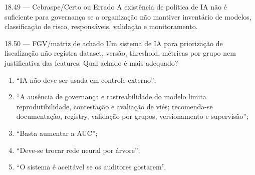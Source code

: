 \begin{questao}{ 18.49 — Cebraspe/Certo ou Errado}
A existência de política de IA não é suficiente para governança se a organização não mantiver inventário de modelos, classificação de risco, responsáveis, validação e monitoramento.
\end{questao}

\begin{questao}{ 18.50 — FGV/matriz de achado}
Um sistema de IA para priorização de fiscalização não registra dataset, versão, threshold, métricas por grupo nem justificativa das features. Qual achado é mais adequado?
\begin{enumerate}[label=\Alph*)]
\item ``IA não deve ser usada em controle externo'';
\item ``A ausência de governança e rastreabilidade do modelo limita reprodutibilidade, contestação e avaliação de viés; recomenda-se documentação, registry, validação por grupos, versionamento e supervisão'';
\item ``Basta aumentar a AUC'';
\item ``Deve-se trocar rede neural por árvore'';
\item ``O sistema é aceitável se os auditores gostarem''.
\end{enumerate}
\end{questao}
